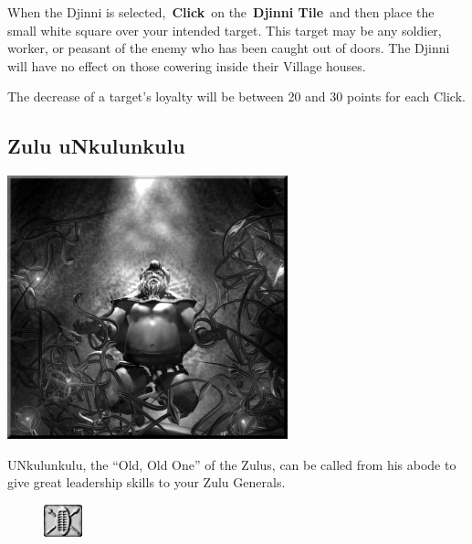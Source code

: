When the Djinni is selected, \textbf{Click} on the \textbf{Djinni Tile} and then place the small white square over your intended target. This target may be any soldier, worker, or peasant of the enemy who has been caught out of doors. The Djinni will have no effect on those cowering inside their Village houses.

The decrease of a target's loyalty will be between 20 and 30 points for each Click.

\subsection{Zulu uNkulunkulu}

\begin{center}
	\includegraphics[width=1\linewidth]{Aoldone}
\end{center}

UNkulunkulu, the “Old, Old One” of the Zulus, can be called from his abode to give great leadership skills to your Zulu Generals.

\begin{figure}
	\vspace{-20pt}
	\begin{center}
		\includegraphics[width=0.1\textwidth]{Toldone}
	\end{center}
	\vspace{-20pt}
\end{figure}

